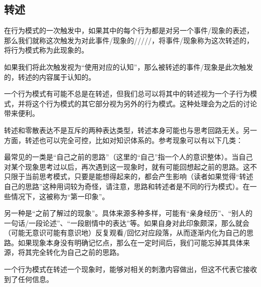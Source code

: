 \subsection{转述} %
在行为模式的一次触发中，如果其中的每个行为都是对另一个事件/现象的表述，那么我们就称这次触发为对此事件/现象的/////，将事件/现象称为这次转述的，将行为模式称为此现象的。
\begin{explain}
如果我们将此次触发视为“使用对应的认知”，那么被转述的事件/现象是此次触发的，转述的内容属于认知的。

一个行为模式有可能不总是在转述，但我们总可以将其中的转述视为一个子行为模式，并将这个行为模式的其它部分视为另外的行为模式。这种处理会为之后的讨论带来便利。

转述和零散表达不是互斥的两种表达类型，转述本身可能也与思考回路无关。另一方面，转述也可以完全可控，比如对知识体系的。参考现象可以有以下几类：

最常见的一类是“自己之前的思路”（这里的“自己”指一个人的意识整体）。当自己对某个现象思考过以后，再次遇到这一现象时，就有可能回想起之前的思路。这不只限于当前思考模式，只要是能想得起来的，都会产生影响（读者如果觉得“转述自己的思路”这种用词较为奇怪，请注意，思路和转述者是不同的行为模式）。在一些情况下，这被称为“第一印象”。

另一种是“之前了解过的现象”。具体来源多种多样，可能有“亲身经历”、“别人的一句话/一段论述”、“一段剧情中的表达”等。如果自身对此印象颇深，那么就会（可能无意识可能有意识地）反复观看/回忆对应段落，从而逐渐内化为自己的思路。如果现象本身没有明确记忆点，那么在一定时间后，我们可能忘掉其具体来源，将其完全转化为自己之前的思路。
\end{explain}
一个行为模式在转述一个现象时，能够对相关的刺激内容做出，但这不代表它接收到了任何信息。
